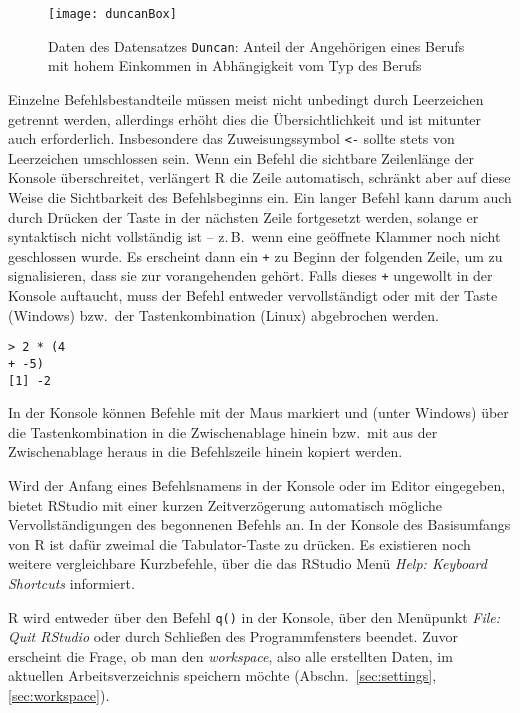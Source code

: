 \begin{figure}[ht]
\centering
\texttt{[image: duncanBox]}
\vspace*{-1em}
\caption{Daten des Datensatzes \lstinline!Duncan!: Anteil der Angehörigen eines Berufs mit hohem Einkommen in Abhängigkeit vom Typ des Berufs}
\label{fig:duncanBox}
\end{figure}

Einzelne Befehlsbestandteile müssen meist nicht unbedingt durch Leerzeichen getrennt werden, allerdings erhöht dies die Übersichtlichkeit und ist mitunter auch erforderlich. Insbesondere das Zuweisungssymbol \lstinline!<-! sollte stets von Leerzeichen umschlossen sein. Wenn ein Befehl die sichtbare Zeilenlänge der Konsole überschreitet, verlängert R die Zeile automatisch, schränkt aber auf diese Weise die Sichtbarkeit des Befehlsbeginns ein. Ein langer Befehl kann darum auch durch Drücken der  Taste in der nächsten Zeile fortgesetzt werden, solange er syntaktisch nicht vollständig ist -- z.\,B.\ wenn eine geöffnete Klammer noch nicht geschlossen wurde. Es erscheint dann ein \lstinline!+! zu Beginn der folgenden Zeile, um zu signalisieren, dass sie zur vorangehenden gehört. Falls dieses \lstinline!+! ungewollt in der Konsole auftaucht, muss der Befehl entweder vervollständigt oder mit der  Taste (Windows) bzw.\ der  Tastenkombination (Linux) abgebrochen werden.
\begin{lstlisting}
> 2 * (4
+ -5)
[1] -2
\end{lstlisting}

In der Konsole können Befehle mit der Maus markiert und (unter Windows) über die Tastenkombination  in die Zwischenablage hinein bzw.\ mit  aus der Zwischenablage heraus in die Befehlszeile hinein kopiert werden.

Wird der Anfang eines Befehlsnamens in der Konsole oder im Editor eingegeben, bietet RStudio mit einer kurzen Zeitverzögerung automatisch mögliche Vervollständigungen des begonnenen Befehls an. In der Konsole des Basisumfangs von R ist dafür zweimal die Tabulator-Taste zu drücken. Es existieren noch weitere vergleichbare Kurzbefehle, über die das RStudio Menü \emph{Help: Keyboard Shortcuts} informiert.

R wird entweder über den Befehl \lstinline!q()! in der Konsole, über den Menüpunkt \emph{File: Quit RStudio} oder durch Schließen des Programmfensters beendet. Zuvor erscheint die Frage, ob man den \emph{workspace}, also alle erstellten Daten, im aktuellen Arbeitsverzeichnis speichern möchte (Abschn.\ \ref{sec:settings}, \ref{sec:workspace}).

